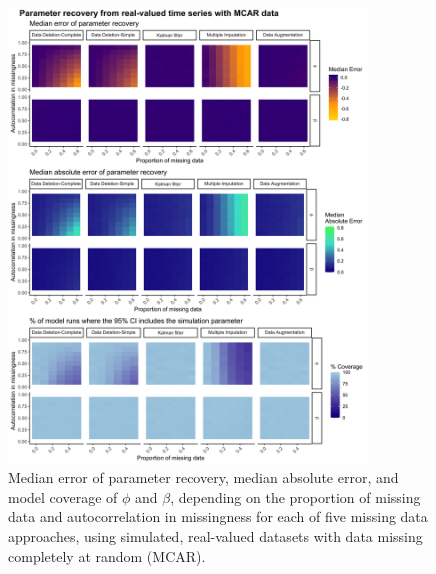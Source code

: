 \documentclass[12pt,english]{article} %
\begin{document}
 \begin{figure}
     \noindent\includegraphics[width = 0.85\textwidth]{Figures/MockedUpFigures/heatmap_GaussianMCAR_all.png}
     \caption{Median error of parameter recovery, median absolute error, and model coverage of $\phi$ and $\beta$, depending on the proportion of missing data and autocorrelation in missingness for each of five missing data approaches, using simulated, real-valued datasets with data missing completely at random (MCAR).}
     \label{fig:GaussianMCARheatmapALL}
 \end{figure}
\end{document}
